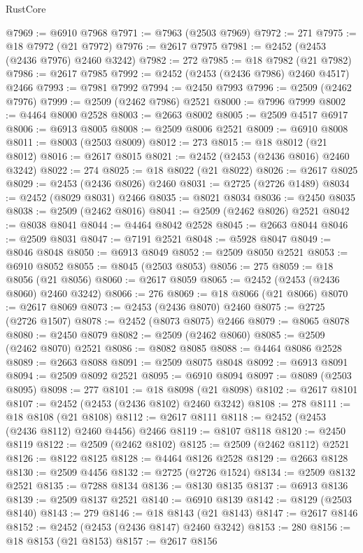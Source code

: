 \begin{lexlean}{RustCore}
\begin{coremodule}
@7969 := @6910 @7968
@7971 := @7963 (@2503 @7969)
@7972 := 271
@7975 := @18 @7972 (@21 @7972)
@7976 := @2617 @7975
@7981 := @2452 (@2453 (@2436 @7976) @2460 @3242)
@7982 := 272
@7985 := @18 @7982 (@21 @7982)
@7986 := @2617 @7985
@7992 := @2452 (@2453 (@2436 @7986) @2460 @4517) @2466
@7993 := @7981 @7992
@7994 := @2450 @7993
@7996 := @2509 (@2462 @7976)
@7999 := @2509 (@2462 @7986) @2521
@8000 := @7996 @7999
@8002 := @4464 @8000 @2528
@8003 := @2663 @8002
@8005 := @2509 @4517 @6917
@8006 := @6913 @8005
@8008 := @2509 @8006 @2521
@8009 := @6910 @8008
@8011 := @8003 (@2503 @8009)
@8012 := 273
@8015 := @18 @8012 (@21 @8012)
@8016 := @2617 @8015
@8021 := @2452 (@2453 (@2436 @8016) @2460 @3242)
@8022 := 274
@8025 := @18 @8022 (@21 @8022)
@8026 := @2617 @8025
@8029 := @2453 (@2436 @8026) @2460
@8031 := @2725 (@2726 @1489)
@8034 := @2452 (@8029 @8031) @2466
@8035 := @8021 @8034
@8036 := @2450 @8035
@8038 := @2509 (@2462 @8016)
@8041 := @2509 (@2462 @8026) @2521
@8042 := @8038 @8041
@8044 := @4464 @8042 @2528
@8045 := @2663 @8044
@8046 := @2509 @8031
@8047 := @7191 @2521
@8048 := @5928 @8047
@8049 := @8046 @8048
@8050 := @6913 @8049
@8052 := @2509 @8050 @2521
@8053 := @6910 @8052
@8055 := @8045 (@2503 @8053)
@8056 := 275
@8059 := @18 @8056 (@21 @8056)
@8060 := @2617 @8059
@8065 := @2452 (@2453 (@2436 @8060) @2460 @3242)
@8066 := 276
@8069 := @18 @8066 (@21 @8066)
@8070 := @2617 @8069
@8073 := @2453 (@2436 @8070) @2460
@8075 := @2725 (@2726 @1507)
@8078 := @2452 (@8073 @8075) @2466
@8079 := @8065 @8078
@8080 := @2450 @8079
@8082 := @2509 (@2462 @8060)
@8085 := @2509 (@2462 @8070) @2521
@8086 := @8082 @8085
@8088 := @4464 @8086 @2528
@8089 := @2663 @8088
@8091 := @2509 @8075 @8048
@8092 := @6913 @8091
@8094 := @2509 @8092 @2521
@8095 := @6910 @8094
@8097 := @8089 (@2503 @8095)
@8098 := 277
@8101 := @18 @8098 (@21 @8098)
@8102 := @2617 @8101
@8107 := @2452 (@2453 (@2436 @8102) @2460 @3242)
@8108 := 278
@8111 := @18 @8108 (@21 @8108)
@8112 := @2617 @8111
@8118 := @2452 (@2453 (@2436 @8112) @2460 @4456) @2466
@8119 := @8107 @8118
@8120 := @2450 @8119
@8122 := @2509 (@2462 @8102)
@8125 := @2509 (@2462 @8112) @2521
@8126 := @8122 @8125
@8128 := @4464 @8126 @2528
@8129 := @2663 @8128
@8130 := @2509 @4456
@8132 := @2725 (@2726 @1524)
@8134 := @2509 @8132 @2521
@8135 := @7288 @8134
@8136 := @8130 @8135
@8137 := @6913 @8136
@8139 := @2509 @8137 @2521
@8140 := @6910 @8139
@8142 := @8129 (@2503 @8140)
@8143 := 279
@8146 := @18 @8143 (@21 @8143)
@8147 := @2617 @8146
@8152 := @2452 (@2453 (@2436 @8147) @2460 @3242)
@8153 := 280
@8156 := @18 @8153 (@21 @8153)
@8157 := @2617 @8156

\end{coremodule}
\end{lexlean}
